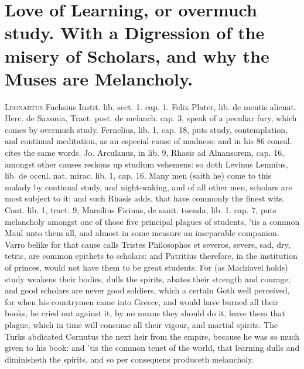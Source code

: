 {{\section[Love of Learning, or overmuch study.]{Love of Learning, or overmuch study. With a Digression of the misery of Scholars, and why the Muses are Melancholy.}
\lettrine{L}{eonartus} Fuchsius Instit. lib.  sect. 1. cap. 1. Felix Plater,
lib.  de mentis alienat. Herc. de Saxonia, Tract. post. de melanch.
cap. 3, speak of a peculiar fury, which comes by overmuch study.
Fernelius, lib. 1, cap. 18, puts study, contemplation, and
continual meditation, as an especial cause of madness: and in his 86
consul. cites the same words. Jo. Arculanus, in lib. 9, Rhasis ad
Alnansorem, cap. 16, amongst other causes reckons up studium vehemens:
so doth Levinus Lemnius, lib. de occul. nat. mirac. lib. 1, cap. 16.
Many men (saith he) come to this malady by continual study,
and night-waking, and of all other men, scholars are most subject to
it: and such Rhasis adds, that have commonly the finest wits.
Cont. lib. 1, tract. 9, Marsilius Ficinus, de sanit. tuenda, lib. 1.
cap. 7, puts melancholy amongst one of those five principal plagues of
students, 'tis a common Maul unto them all, and almost in some measure
an inseparable companion. Varro belike for that cause calls Tristes
Philosophos et severos, severe, sad, dry, tetric, are common epithets
to scholars: and Patritius therefore, in the institution of
princes, would not have them to be great students. For (as Machiavel
holds) study weakens their bodies, dulls the spirits, abates their
strength and courage; and good scholars are never good soldiers, which
a certain Goth well perceived, for when his countrymen came into
Greece, and would have burned all their books, he cried out against it,
by no means they should do it,  leave them that plague, which in
time will consume all their vigour, and martial spirits. The
Turks abdicated Cornutus the next heir from the empire, because
he was so much given to his book: and 'tis the common tenet of the
world, that learning dulls and diminisheth the spirits, and so per
consequens produceth melancholy.

}}
